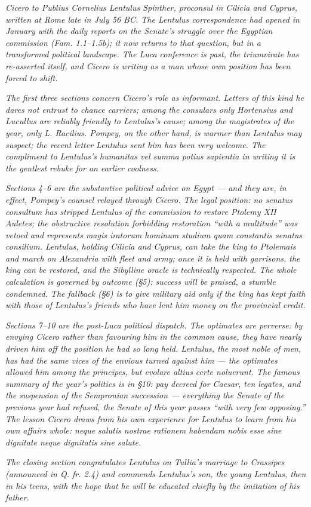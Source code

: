 
\textit{Cicero to Publius Cornelius Lentulus Spinther,
proconsul in Cilicia and Cyprus, written at Rome late in
July 56 BC. The Lentulus correspondence had opened in
January with the daily reports on the Senate's struggle over
the Egyptian commission (\textit{Fam.} 1.1--1.5b); it now
returns to that question, but in a transformed political
landscape. The Luca conference is past, the triumvirate has
re-asserted itself, and Cicero is writing as a man whose own
position has been forced to shift.}

\textit{The first three sections concern Cicero's role as
informant. Letters of this kind he dares not entrust to chance
carriers; among the consulars only Hortensius and Lucullus are
reliably friendly to Lentulus's cause; among the magistrates
of the year, only L. Racilius. Pompey, on the other hand, is
warmer than Lentulus may suspect; the recent letter Lentulus
sent him has been very welcome. The compliment to Lentulus's
\textit{humanitas vel summa potius sapientia} in writing it is
the gentlest rebuke for an earlier coolness.}

\textit{Sections 4--6 are the substantive political advice on
Egypt --- and they are, in effect, Pompey's counsel relayed
through Cicero. The legal position: no \textit{senatus
consultum} has stripped Lentulus of the commission to restore
Ptolemy XII Auletes; the obstructive resolution forbidding
restoration ``with a multitude'' was vetoed and represents
\textit{magis iratorum hominum studium quam constantis senatus
consilium}. Lentulus, holding Cilicia and Cyprus, can take
the king to Ptolemais and march on Alexandria with fleet and
army; once it is held with garrisons, the king can be
restored, and the Sibylline oracle is technically respected.
The whole calculation is governed by outcome (\S 5): success
will be praised, a stumble condemned. The fallback (\S 6) is
to give military aid only if the king has kept faith with
those of Lentulus's friends who have lent him money on the
provincial credit.}

\textit{Sections 7--10 are the post-Luca political dispatch.
The optimates are perverse: by envying Cicero rather than
favouring him in the common cause, they have nearly driven
him off the position he had so long held. Lentulus, the
most noble of men, has had the same vices of the envious
turned against him --- the optimates allowed him among the
\textit{principes}, but \textit{evolare altius certe
noluerunt}. The famous summary of the year's politics is in
\S 10: pay decreed for Caesar, ten legates, and the
suspension of the Sempronian succession --- everything the
Senate of the previous year had refused, the Senate of this
year passes ``with very few opposing.'' The lesson Cicero
draws from his own experience for Lentulus to learn from
his own affairs whole: \textit{neque salutis nostrae
rationem habendam nobis esse sine dignitate neque
dignitatis sine salute}.}

\textit{The closing section congratulates Lentulus on
Tullia's marriage to Crassipes (announced in \textit{Q. fr.}
2.4) and commends Lentulus's son, the young Lentulus, then
in his teens, with the hope that he will be educated chiefly
by the imitation of his father.}
